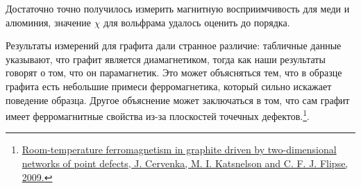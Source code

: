 \documentclass[12pt,a4paper]{article}
\begin{document}
	Достаточно точно получилось измерить магнитную восприимчивость для меди и алюминия, значение $\chi$ для вольфрама удалось оценить до порядка.
	
	Результаты измерений для графита дали странное различие: табличные данные указывают, что графит является диамагнетиком, тогда как наши результаты говорят о том, что он парамагнетик. Это может объясняться тем, что в образце графита есть небольшие примеси ферромагнетика, который сильно искажает поведение образца. Другое объяснение может заключаться в том, что сам графит имеет ферромагнитные свойства из-за плоскостей точечных дефектов.\footnote{
		\href{https://www.nature.com/articles/nphys1399}{Room-temperature ferromagnetism in graphite driven by two-dimensional networks of point defects, J. Cervenka, M. I. Katsnelson and C. F. J. Flipse, 2009.}
	}.
	
\end{document}
